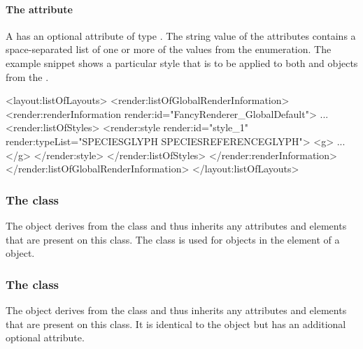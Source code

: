 \paragraph{The \fixttspace{} attribute}

A \Style has an optional attribute  of type
. The string value of the  attributes contains 
a space-separated list of one or more of the values from the \StyleType enumeration.
 The example snippet shows a particular style that is to be applied to 
both  and  objects from 
the \LayoutPackage.

\pagebreak
{\footnotesize
\begin{example}
<layout:listOfLayouts>
   <render:listOfGlobalRenderInformation>
      <render:renderInformation render:id="FancyRenderer_GlobalDefault">
             ...
        <render:listOfStyles>
             <render:style render:id="style_1" render:typeList="SPECIESGLYPH SPECIESREFERENCEGLYPH">
                <g> ... </g>
             </render:style> 
        </render:listOfStyles>
      </render:renderInformation>
   </render:listOfGlobalRenderInformation>
</layout:listOfLayouts>
\end{example}
}

\subsubsection{The  class}
\label{globalstyle-class}

The \GlobalStyle object derives from the \Style class and thus inherits
any attributes and elements that are present on this class. The \GlobalStyle 
class is used for objects in the \ListOfGlobalStyles element of a 
\GlobalRenderInformation object.



\subsubsection{The  class}
\label{localstyle-class}

The \LocalStyle object derives from the \Style class and thus inherits
any attributes and elements that are present on this class. It is identical to 
the \GlobalStyle object but has an additional optional  attribute.

